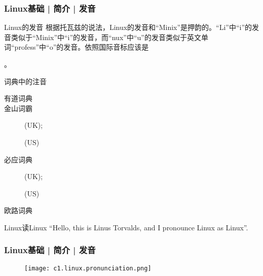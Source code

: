 \begin{frame}
  \frametitle{Linux基础 | 简介 | 发音}
  \begin{block}{Linux的发音}
  根据托瓦兹的说法，Linux的发音和“Minix”是押韵的。“Li”中“i”的发音类似于“Minix”中“i”的发音，而“nux”中“u”的发音类似于英文单词“profess”中“o”的发音。依照国际音标应该是\begin{IPA}[tt]['lIn@ks]\end{IPA}。
  \end{block}
  \pause
  \begin{block}{词典中的注音}
    \begin{description}
      \item[有道词典] \begin{IPA}[tt]['lIn@ks]\end{IPA}
      \item[金山词霸] \begin{IPA}[tt]['lIn@ks]\end{IPA}(UK); \begin{IPA}[tt]['lIn@ks]\end{IPA}(US)
      \item[必应词典] \begin{IPA}[tt]['lIn@ks]\end{IPA}(UK); \begin{IPA}[tt]['laIn2ks]\end{IPA}(US)
      \item[欧路词典] \begin{IPA}[tt]['laIn2ks]\end{IPA}
    \end{description}
  \end{block}
  \pause
  \begin{block}{Linux读Linux}
    ``Hello, this is Linus Torvalds, and I pronounce Linux as Linux''.
  \end{block}
\end{frame}

\begin{frame}
  \frametitle{Linux基础 | 简介 | 发音}
  \begin{figure}
    \centering
    \texttt{[image: c1.linux.pronunciation.png]}
  \end{figure}
\end{frame}

